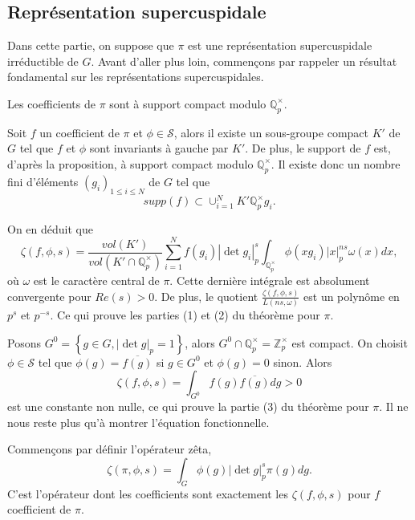 \subsection{Représentation supercuspidale}

Dans cette partie, on suppose que $\pi$ est une représentation supercuspidale irréductible de $G$. Avant d'aller plus loin, commençons par rappeler un résultat fondamental sur les représentations supercuspidales.

\begin{proposition}
\label{suppcompact}
Les coefficients de $\pi$ sont à support compact modulo $\mathbb{Q}_p^\times$.
\end{proposition}

Soit $f$ un coefficient de $\pi$ et $\phi \in \mathcal{S}$, alors il existe un sous-groupe compact $K'$ de $G$ tel que $f$ et $\phi$ sont invariants à gauche par $K'$. De plus, le support de $f$ est, d'après la proposition, à support compact modulo $\mathbb{Q}_p^\times$. Il existe donc un nombre fini d'éléments $(g_i)_{1 \leq i \leq N}$ de $G$ tel que
\begin{equation}
supp(f) \subset \cup_{i=1}^N K'\mathbb{Q}_p^\times g_i.
\end{equation}

On en déduit que
\begin{equation}
\zeta(f,\phi,s) = \frac{vol(K')}{vol(K' \cap \mathbb{Q}_p^\times)} \sum_{i=1}^N f(g_i)|\det g_i|_p^s \int_{\mathbb{Q}_p^\times} \phi(xg_i)|x|_p^{ns}\omega(x)dx,
\end{equation}
où $\omega$ est le caractère central de $\pi$. Cette dernière intégrale est absolument convergente pour $Re(s) > 0$. De plus, le quotient $\frac{\zeta(f,\phi,s)}{L(ns,\omega)}$ est un polynôme en $p^s$ et $p^{-s}$. Ce qui prouve les parties (1) et (2) du théorème pour $\pi$.

Posons $G^0=\left\lbrace g \in G, |\det g|_p = 1 \right\rbrace$, alors $G^0 \cap \mathbb{Q}_p^\times = \mathbb{Z}_p^\times$ est compact. On choisit $\phi \in \mathcal{S}$ tel que $\phi(g) = \overline{f(g)}$ si $g \in G^0$ et $\phi(g)=0$ sinon. Alors
\begin{equation}
\zeta(f, \phi, s) = \int_{G^0} f(g)\overline{f(g)} dg > 0
\end{equation}
est une constante non nulle, ce qui prouve la partie (3) du théorème pour $\pi$. Il ne nous reste plus qu'à montrer l'équation fonctionnelle.

Commençons par définir l'opérateur zêta,
\begin{equation}
\zeta(\pi, \phi, s) = \int_G \phi(g)|\det g|_p^s\pi(g) dg.
\end{equation}
C'est l'opérateur dont les coefficients sont exactement les $\zeta(f, \phi,s)$ pour $f$ coefficient de $\pi$.

